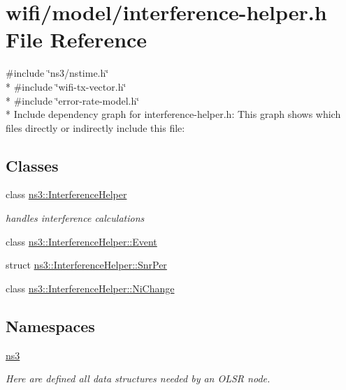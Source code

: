 \hypertarget{interference-helper_8h}{}\section{wifi/model/interference-\/helper.h File Reference}
\label{interference-helper_8h}
{\ttfamily \#include \char`\"{}ns3/nstime.\+h\char`\"{}}\\*
{\ttfamily \#include \char`\"{}wifi-\/tx-\/vector.\+h\char`\"{}}\\*
{\ttfamily \#include \char`\"{}error-\/rate-\/model.\+h\char`\"{}}\\*
Include dependency graph for interference-\/helper.h\+:
This graph shows which files directly or indirectly include this file\+:
\subsection*{Classes}
\begin{DoxyCompactItemize}
\item 
class \hyperlink{classns3_1_1InterferenceHelper}{ns3\+::\+Interference\+Helper}
\begin{DoxyCompactList}\small\item\em handles interference calculations \end{DoxyCompactList}\item 
class \hyperlink{classns3_1_1InterferenceHelper_1_1Event}{ns3\+::\+Interference\+Helper\+::\+Event}
\item 
struct \hyperlink{structns3_1_1InterferenceHelper_1_1SnrPer}{ns3\+::\+Interference\+Helper\+::\+Snr\+Per}
\item 
class \hyperlink{classns3_1_1InterferenceHelper_1_1NiChange}{ns3\+::\+Interference\+Helper\+::\+Ni\+Change}
\end{DoxyCompactItemize}
\subsection*{Namespaces}
\begin{DoxyCompactItemize}
\item 
 \hyperlink{namespacens3}{ns3}
\begin{DoxyCompactList}\small\item\em Here are defined all data structures needed by an O\+L\+SR node. \end{DoxyCompactList}\end{DoxyCompactItemize}
